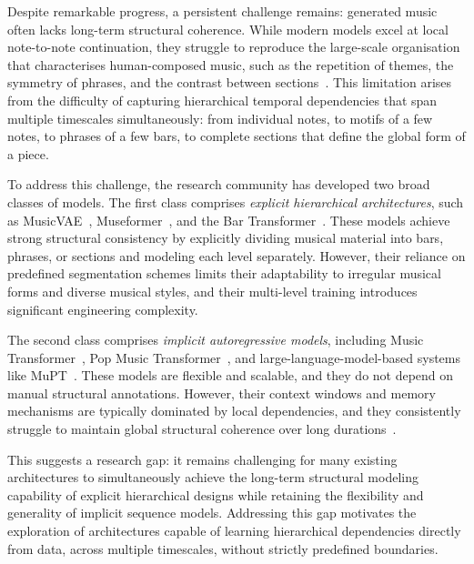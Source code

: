\documentclass[conference]{IEEEtran}
\begin{document}
Despite remarkable progress, a persistent challenge remains: generated music often lacks long-term structural coherence. While modern models excel at local note-to-note continuation, they struggle to reproduce the large-scale organisation that characterises human-composed music, such as the repetition of themes, the symmetry of phrases, and the contrast between sections~\cite{bhandari2024, deberardinis2022}.
This limitation arises from the difficulty of capturing hierarchical temporal dependencies that span multiple timescales simultaneously:
from individual notes, to motifs of a few notes, to phrases of a few bars, to complete sections that define the global form of a piece.

To address this challenge, the research community has developed two broad classes of models. The first class comprises \emph{explicit hierarchical architectures}, such as MusicVAE~\cite{roberts2018}, Museformer~\cite{yu2022}, and the Bar Transformer~\cite{qin2023}. These models achieve strong structural consistency by explicitly dividing musical material into bars, phrases, or sections and modeling each level separately. However, their reliance on predefined
segmentation schemes limits their adaptability to irregular musical forms and diverse musical styles, and their multi-level training introduces significant engineering complexity.

The second class comprises \emph{implicit autoregressive models},
including Music Transformer~\cite{huang2019}, Pop Music
Transformer~\cite{huang2020}, and large-language-model-based systems like MuPT~\cite{qu2024}. These models are flexible and scalable, and they do not depend on manual structural annotations. However, their context windows and memory mechanisms are typically dominated by local dependencies, and they consistently struggle to maintain global structural coherence over long durations~\cite{bhandari2024}.


This suggests a research gap: it remains challenging for many existing architectures to simultaneously achieve the long-term structural modeling capability of explicit hierarchical designs while retaining the flexibility and generality of implicit sequence models. Addressing this gap motivates the exploration of architectures capable of learning hierarchical dependencies directly from data, across multiple timescales, without strictly predefined boundaries.
\end{document}
